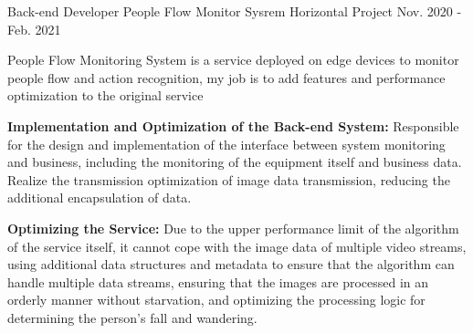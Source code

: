 \begin{cventries}
  \cventry
    {Back-end Developer} %
    {People Flow Monitor Sysrem} %
    {Horizontal Project} %
    {Nov. 2020 - Feb. 2021} %
    {
      \begin{cvitems} %
        \item {People Flow Monitoring System is a service deployed on edge devices to monitor people flow and action recognition, my job is to add features and performance optimization to the original service}
        \item {\textbf{Implementation and Optimization of the Back-end System:}
        Responsible for the design and implementation of the interface between system monitoring and business, including the monitoring of the equipment itself and business data.
        Realize the transmission optimization of image data transmission, reducing the additional encapsulation of data.}
        \item {\textbf{Optimizing the Service:}
        Due to the upper performance limit of the algorithm of the service itself, it cannot cope with the image data of multiple video streams,
        using additional data structures and metadata to ensure that the algorithm can handle multiple data streams, ensuring that the images are processed in an orderly manner without starvation,
        and optimizing the processing logic for determining the person's fall and wandering.}
      \end{cvitems}
    }
\end{cventries}
